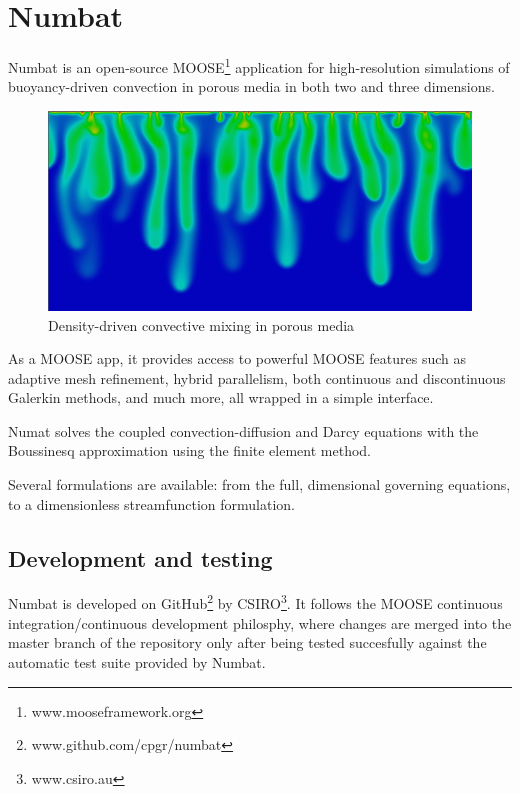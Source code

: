 \documentclass[12pt, a4paper, midday, formal]{csiroreport2017}
\begin{document}
\clearpage
\listoffigures
\clearpage
{}

%
%
\section{Numbat}

Numbat is an open-source MOOSE\footnote{www.mooseframework.org} application for high-resolution simulations of buoyancy-driven convection in porous media in both two and three dimensions.

\begin{figure}[ht]
\begin{center}
\includegraphics[width=\textwidth]{../content/media/convection.png}
\caption{Density-driven convective mixing in porous media}
\label{fig:convection}
\end{center}
\end{figure}

As a MOOSE app, it provides access to powerful MOOSE features such as adaptive mesh refinement, hybrid parallelism, both continuous and discontinuous Galerkin methods, and much more, all wrapped in a simple interface.

Numat solves the coupled convection-diffusion and Darcy equations with the Boussinesq approximation using the finite element method.

Several formulations are available: from the full, dimensional governing equations, to a dimensionless streamfunction formulation.

\subsection{Development and testing}

Numbat is developed on GitHub\footnote{www.github.com/cpgr/numbat} by CSIRO\footnote{www.csiro.au}. It follows the MOOSE continuous
integration/continuous development philosphy, where changes are merged into the master branch of the repository only after being tested
succesfully against the automatic test suite provided by Numbat.
\end{document}
